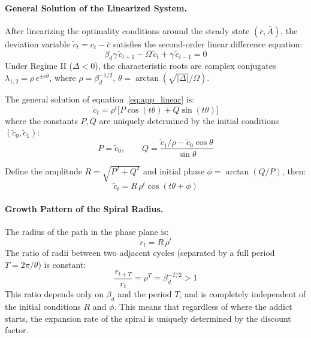 \documentclass[12pt]{article}
\begin{document}
\paragraph{General Solution of the Linearized System.}
After linearizing the optimality conditions around the steady state $(\bar{c}, \bar{A})$, the deviation variable
$\tilde{c}_t = c_t - \bar{c}$ satisfies the second-order linear difference equation:
\begin{equation}\label{eq:app_linear}
\beta_d\gamma\,\tilde{c}_{t+1} - \Omega\,\tilde{c}_t + \gamma\,\tilde{c}_{t-1} = 0
\end{equation}
Under Regime II ($\Delta < 0$), the characteristic roots are complex conjugates
$\lambda_{1,2} = \rho\,e^{\pm i\theta}$, where
$\rho = \beta_d^{-1/2}$, $\theta = \arctan(\sqrt{|\Delta|}/\Omega)$.

The general solution of equation~\eqref{eq:app_linear} is:
\begin{equation}\label{eq:app_solution}
\tilde{c}_t = \rho^t \bigl[P\cos(t\theta) + Q\sin(t\theta)\bigr]
\end{equation}
where the constants $P, Q$ are uniquely determined by the initial conditions $(\tilde{c}_0, \tilde{c}_1)$:
\begin{equation}
P = \tilde{c}_0, \qquad
Q = \frac{\tilde{c}_1/\rho - \tilde{c}_0\cos\theta}{\sin\theta}
\end{equation}

Define the amplitude $R = \sqrt{P^2 + Q^2}$ and initial phase $\phi = \arctan(Q/P)$, then:
\begin{equation}\label{eq:app_amplitude}
\tilde{c}_t = R\,\rho^t\cos(t\theta + \phi)
\end{equation}

\paragraph{Growth Pattern of the Spiral Radius.}
The radius of the path in the phase plane is:
\begin{equation}
r_t = R\,\rho^t
\end{equation}
The ratio of radii between two adjacent cycles (separated by a full period $T = 2\pi/\theta$) is constant:
\begin{equation}\label{eq:app_ratio}
\frac{r_{t+T}}{r_t} = \rho^T = \beta_d^{-T/2} > 1
\end{equation}
This ratio depends only on $\beta_d$ and the period $T$, and is completely independent of the initial conditions $R$ and $\phi$.
This means that regardless of where the addict starts, the expansion rate of the spiral is uniquely determined by the discount factor.
\end{document}

